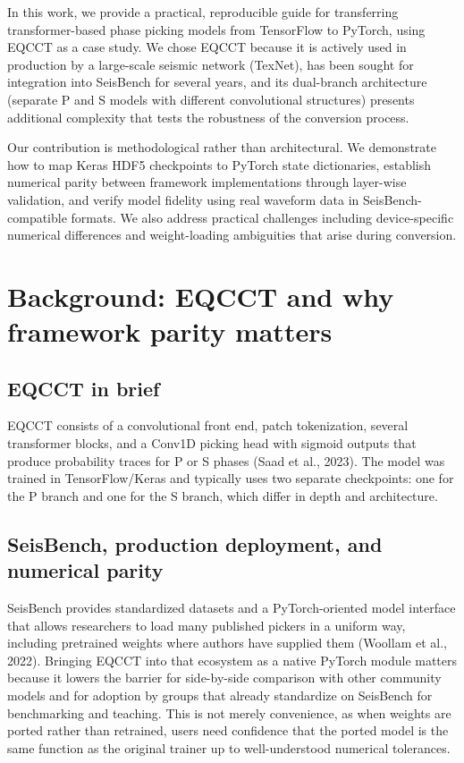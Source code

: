 In this work, we provide a practical, reproducible guide for transferring transformer-based phase picking models from TensorFlow to PyTorch, using EQCCT as a case study. We chose EQCCT because it is actively used in production by a large-scale seismic network (TexNet), has been sought for integration into SeisBench for several years, and its dual-branch architecture (separate P and S models with different convolutional structures) presents additional complexity that tests the robustness of the conversion process.

Our contribution is methodological rather than architectural. We demonstrate how to map Keras HDF5 checkpoints to PyTorch state dictionaries, establish numerical parity between framework implementations through layer-wise validation, and verify model fidelity using real waveform data in SeisBench-compatible formats. We also address practical challenges including device-specific numerical differences and weight-loading ambiguities that arise during conversion.

\section{Background: EQCCT and why framework parity matters}

\subsection{EQCCT in brief}

EQCCT consists of a convolutional front end, patch tokenization, several transformer blocks, and a Conv1D picking head with sigmoid outputs that produce probability traces for P or S phases (Saad et al., 2023). The model was trained in TensorFlow/Keras and typically uses two separate checkpoints: one for the P branch and one for the S branch, which differ in depth and architecture.

\subsection{SeisBench, production deployment, and numerical parity}

SeisBench provides standardized datasets and a PyTorch-oriented model interface that allows researchers to load many published pickers in a uniform way, including pretrained weights where authors have supplied them (Woollam et al., 2022). Bringing EQCCT into that ecosystem as a native PyTorch module matters because it lowers the barrier for side-by-side comparison with other community models and for adoption by groups that already standardize on SeisBench for benchmarking and teaching. This is not merely convenience, as when weights are ported rather than retrained, users need confidence that the ported model is the same function as the original trainer up to well-understood numerical tolerances.

